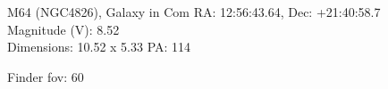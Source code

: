\begin{block}{M64 (NGC4826), Galaxy in Com}
    RA: 12:56:43.64, Dec: +21:40:58.7 \\ 
    Magnitude (V): 8.52 \\ 
    Dimensions: 10.52 x 5.33 PA: 114 

    Finder fov: 60 
\end{block}